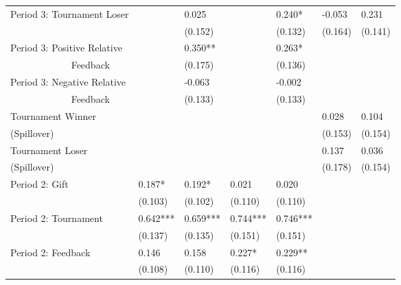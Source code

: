 \documentclass{article}
\begin{document}
\begin{table}[H]
\begin{center}
{\begin{tabular}{lll|ll|ll}
Period 3: Tournament Loser&               &       0.025   &               &       0.240*  &      -0.053   &       0.231   \\
                    &               &     (0.152)   &               &     (0.132)   &     (0.164)   &     (0.141)   \\[2mm]
Period 3: Positive Relative &               &       0.350** &               &       0.263*  &               &               \\
 ~~~~~~~~~~~~ Feedback       &               &     (0.175)   &               &     (0.136)   &               &               \\[2mm]
Period 3: Negative Relative&               &      -0.063   &               &      -0.002   &               &               \\
~~~~~~~~~~~~ Feedback    &               &     (0.133)   &               &     (0.133)   &               &               \\[2mm]
Tournament Winner &               &               &               &               &       0.028   &       0.104   \\
         (Spillover)           &               &               &               &               &     (0.153)   &     (0.154)   \\[2mm]
Tournament Loser &               &               &               &               &       0.137   &       0.036   \\
               (Spillover)     &               &               &               &               &     (0.178)   &     (0.154)   \\[2mm]
Period 2: Gift      &       0.187*  &       0.192*  &       0.021   &       0.020   &               &               \\
                    &     (0.103)   &     (0.102)   &     (0.110)   &     (0.110)   &               &               \\[2mm]
Period 2: Tournament&       0.642***&       0.659***&       0.744***&       0.746***&               &               \\
                    &     (0.137)   &     (0.135)   &     (0.151)   &     (0.151)   &               &               \\[2mm]
Period 2: Feedback  &       0.146   &       0.158   &       0.227*  &       0.229** &               &               \\
                    &     (0.108)   &     (0.110)   &     (0.116)   &     (0.116)   &               &               \\[2mm]

\end{tabular}}
\end{center}
\end{table}
\end{document}
